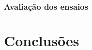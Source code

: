 \documentclass[
	12pt,				%
	openright,			%
	oneside,			%
	a4paper,			%
	english,			%
	french,				%
	spanish,			%
	brazil,				%
	oldfontcommands
	]{abntex2}
\begin{document}
\subsection[Avaliação dos ensaios]{Avaliação dos ensaios}





\chapter[Conclusões]{Conclusões} \label{ultimo_capitulo}



\end{document}
